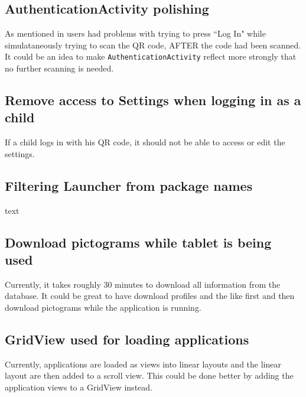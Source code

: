 \subsection{AuthenticationActivity polishing}

As mentioned in  users had problems with trying to press ``Log In" while simulataneously trying to scan the QR code, AFTER the code had been scanned.
It could be an idea to make \lstinline!AuthenticationActivity! reflect more strongly that no further scanning is needed.

\subsection{Remove access to Settings when logging in as a child}

If a child logs in with his QR code, it should not be able to access or edit the settings.

\subsection{Filtering Launcher from package names}
text

\subsection{Download pictograms while tablet is being used}
Currently, it takes roughly 30 minutes to download all information from the database.
It could be great to have \launcher download profiles and the like first and then download pictograms while the application is running.

\subsection{GridView used for loading applications}

Currently, applications are loaded as views into linear layouts and the linear layout are then added to a scroll view.
This could be done better by adding the application views to a GridView instead.